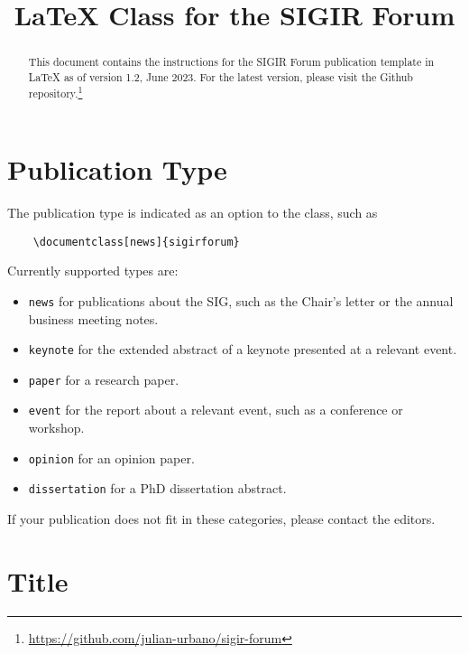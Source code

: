 \documentclass[news]{sigirforum}
\begin{document}
\title{\LaTeX\xspace Class for the SIGIR Forum}


\maketitle 
\begin{abstract}
This document contains the instructions for the SIGIR Forum publication template in \LaTeX\xspace as of version 1.2, June 2023. For the latest version, please visit the Github repository.\footnote{\url{https://github.com/julian-urbano/sigir-forum}}
\end{abstract}

\section{Publication Type}

The publication type is indicated as an option to the class, such as
\begin{verbatim}
    \documentclass[news]{sigirforum}
\end{verbatim}
Currently supported types are:
\begin{itemize}
	\item \texttt{news} for publications about the SIG, such as the Chair's letter or the annual business meeting notes.
	\item \texttt{keynote} for the extended abstract of a keynote presented at a relevant event.
	\item \texttt{paper} for a research paper.
	\item \texttt{event} for the report about a relevant event, such as a conference or workshop.
	\item \texttt{opinion} for an opinion paper.
	\item \texttt{dissertation} for a PhD dissertation abstract.
\end{itemize}

If your publication does not fit in these categories, please contact the editors.

\section{Title}
\end{document}
